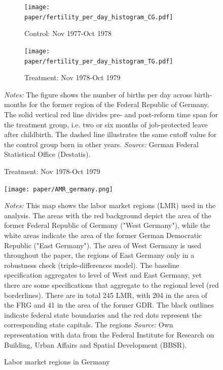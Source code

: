 \documentclass[11pt, a4paper,draft]{article} %
\begin{document}
\begin{landscape}
	\vspace*{\fill}
	\begin{figure}
		[H]\centering
		\caption{Fertility distribution for different years}\label{fig: fertility_hist}
		\begin{subfigure}[h]{0.40\linewidth}\centering
			\caption{Control: Nov 1977-Oct 1978}
			\texttt{[image: paper/fertility\_per\_day\_histogram\_CG.pdf]}
		\end{subfigure}
		\begin{subfigure}[h]{0.40\linewidth}\centering
			\caption{Treatment: Nov 1978-Oct 1979}
			\texttt{[image: paper/fertility\_per\_day\_histogram\_TG.pdf]}
		\end{subfigure}
		\scriptsize
		\begin{minipage}{0.95\linewidth}
			\emph{Notes:} The figure shows the number of births per day across birth-months for the former region of the Federal Republic of Germany. The solid vertical red line divides pre- and post-reform time span for the treatment group, i.e. two or six months of job-protected leave after childbirth. The dashed line illustrates the same cutoff value for the control group born in other years.\newline
			\emph{Source:} German Federal Statistical Office (Destatis).
		\end{minipage}
	\end{figure}
	\vspace*{\fill}\clearpage
\end{landscape}
\vspace*{\fill}
\begin{figure}[H]\centering
	\caption{Labor market regions in Germany}\label{fig: AMR_regions_Germany}
	\texttt{[image: paper/AMR\_germany.png]}
	\scriptsize
	\begin{minipage}{0.9 \linewidth}
		\emph{Notes:} This map shows the labor market regions (LMR) used in the analysis. The areas with the red background depict the area of the former Federal Republic of Germany ("West Germany"), while the white areas indicate the area of the former German Democratic Republic ("East Germany"). The area of West Germany is used throughout the paper, the regions of East Germany only in a robustness check (triple-differences model). The baseline specification aggregates to level of West and East Germany, yet there are some specifications that aggregate to the regional level (red borderlines). There are in total 245 LMR, with 204 in the area of the FRG and 41 in the area of the former GDR. The black outlines indicate federal state boundaries and the red dots represent the corresponding state capitals. The regions \newline \emph{Source:} Own representation with data from the Federal Institute for Research on Building, Urban Affairs and Spatial Development (BBSR).
	\end{minipage}
\end{figure}
\vspace*{\fill}\clearpage
\newpage
\end{document}
